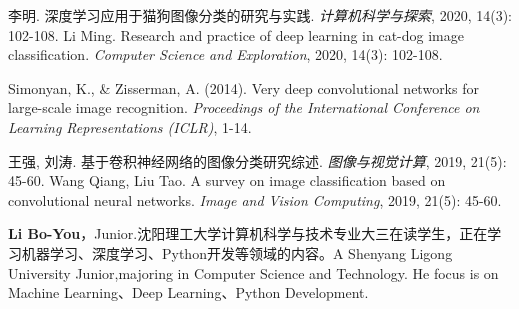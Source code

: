 \documentclass[10.5pt,compsoc]{CjC}
\theoremstyle{mystyle}
\begin{document}
\begin{CJK*}{GBK}{song}
\begin{thebibliography}{99}
李明. 深度学习应用于猫狗图像分类的研究与实践. \textit{计算机科学与探索}, 2020, 14(3): 102-108. \newline
Li Ming. Research and practice of deep learning in cat-dog image classification. \textit{Computer Science and Exploration}, 2020, 14(3): 102-108.

Simonyan, K., & Zisserman, A. (2014). Very deep convolutional networks for large-scale image recognition. \textit{Proceedings of the International Conference on Learning Representations (ICLR)}, 1-14.

王强, 刘涛. 基于卷积神经网络的图像分类研究综述. \textit{图像与视觉计算}, 2019, 21(5): 45-60. \newline
Wang Qiang, Liu Tao. A survey on image classification based on convolutional neural networks. \textit{Image and Vision Computing}, 2019, 21(5): 45-60.

\end{thebibliography}




\begin{strip}
\end{strip}

\begin{biography}
\noindent
\textbf{Li Bo-You}，Junior.沈阳理工大学计算机科学与技术专业大三在读学生，正在学习机器学习、深度学习、Python开发等领域的内容。A Shenyang Ligong University Junior,majoring in Computer Science and Technology. He focus is on Machine Learning、Deep Learning、Python Development.

\end{biography}



\end{CJK*}
\end{document}
